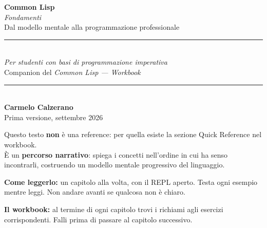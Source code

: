 \documentclass[a4paper,11pt,oneside]{book}
\begin{document}
\begin{titlepage}
  \centering
  \vspace*{2.5cm}
  {\Huge\bfseries\color{csBlue} Common Lisp}\\[0.5cm]
  {\LARGE\itshape Fondamenti}\\[0.4cm]
  {\large Dal modello mentale alla programmazione professionale}\\[2.5cm]
  \textcolor{csBlue!30}{\rule{0.5\textwidth}{1.5pt}}\\[1.2cm]
  {\large\itshape Per studenti con basi di programmazione imperativa}\\[0.5cm]
  {\normalsize Companion del \textit{Common Lisp — Workbook}}\\[2.5cm]
  \textcolor{csBlue!30}{\rule{0.5\textwidth}{0.4pt}}\\[0.8cm]
  {\large\textbf{Carmelo Calzerano}}\\[1.2cm]
  {\normalsize Prima versione, settembre 2026}
  \vfill
\end{titlepage}

\thispagestyle{empty}

\begin{tcolorbox}[
  enhanced,
  colback=boxConBack,
  colframe=boxConFrame,
  fonttitle=\bfseries\large,
  title=Come usare questo testo,
  boxrule=0.8pt,
  arc=4pt,
  left=14pt, right=14pt, top=12pt, bottom=12pt
]
Questo testo \textbf{non} è una reference: per quella esiste la sezione Quick Reference nel workbook.\\[6pt]
È un \textbf{percorso narrativo}: spiega i concetti nell'ordine in cui
ha senso incontrarli, costruendo un modello mentale progressivo
del linguaggio.

\medskip
\textbf{Come leggerlo:} un capitolo alla volta, con il REPL aperto.
Testa ogni esempio mentre leggi. Non andare avanti se qualcosa non è chiaro.

\medskip
\textbf{Il workbook:} al termine di ogni capitolo trovi i richiami agli
esercizi corrispondenti. Falli prima di passare al capitolo successivo.
\end{tcolorbox}

\vspace{1.5em}
\end{document}
